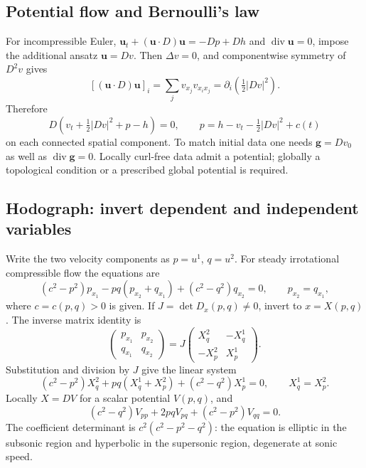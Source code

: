 \Needspace{35mm}
\subsection{Potential flow and Bernoulli's law}
For incompressible Euler,
$\mathbf u_t+(\mathbf u\cdot D)\mathbf u=-Dp+D h$ and
$\operatorname{div}\mathbf u=0$, impose the additional ansatz
$\mathbf u=Dv$.
Then $\Delta v=0$, and componentwise symmetry of $D^2v$ gives
\[
 [(\mathbf u\cdot D)\mathbf u]_i
 =\sum_jv_{x_j}v_{x_ix_j}
 =\partial_i\left(\tfrac12|Dv|^2\right).
\]
Therefore
\[
 D(v_t+\tfrac12|Dv|^2+p-h)=0,\qquad
 p=h-v_t-\tfrac12|Dv|^2+c(t)
\]
on each connected spatial component.
To match initial data one needs $\mathbf g=Dv_0$ as well as
$\operatorname{div}\mathbf g=0$.
Locally curl-free data admit a potential; globally a topological
condition or a prescribed global potential is required.
\Needspace{45mm}

\Needspace{35mm}
\subsection{Hodograph: invert dependent and independent variables}
Write the two velocity components as $p=u^1$, $q=u^2$.
For steady irrotational compressible flow the equations are
\[
 (c^2-p^2)p_{x_1}-pq(p_{x_2}+q_{x_1})
       +(c^2-q^2)q_{x_2}=0,\qquad p_{x_2}=q_{x_1},
\]
where $c=c(p,q)>0$ is given.
If $J=\det D_x(p,q)\ne0$, invert to $x=X(p,q)$.
The inverse matrix identity is
\[
 \begin{pmatrix}p_{x_1}&p_{x_2}\\q_{x_1}&q_{x_2}\end{pmatrix}
 =J\begin{pmatrix}X^2_q&-X^1_q\\-X^2_p&X^1_p\end{pmatrix}.
\]
Substitution and division by $J$ give the linear system
\[
 (c^2-p^2)X^2_q+pq(X^1_q+X^2_p)+(c^2-q^2)X^1_p=0,
 \qquad X^1_q=X^2_p .
\]
Locally $X=DV$ for a scalar potential $V(p,q)$, and
\[
 (c^2-q^2)V_{pp}+2pqV_{pq}+(c^2-p^2)V_{qq}=0 .
\]
The coefficient determinant is $c^2(c^2-p^2-q^2)$:
the equation is elliptic in the subsonic region and hyperbolic
in the supersonic region, degenerate at sonic speed.
\Needspace{45mm}

